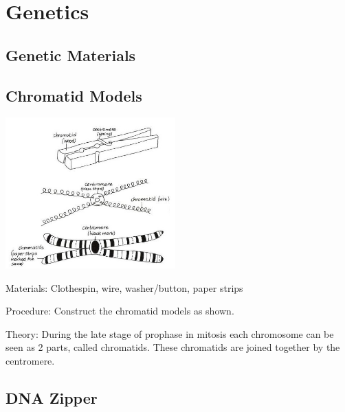\section{Genetics}

\begin{multicols}{2}


\section*{Genetic Materials}


\subsection{Chromatid Models} %

\begin{center}
\includegraphics[width=0.49\textwidth]{./img/vso/chromatid.jpg}
\end{center}

\begin{description*}
\item[Materials:]{Clothespin, wire, washer/button, paper strips}
\item[Procedure:]{Construct the chromatid models as shown.}
\item[Theory:]{During the late stage of prophase in mitosis each chromosome can be
seen as 2 parts, called chromatids. These chromatids are joined
together by the centromere.}
\end{description*}

\subsection{DNA Zipper} %


\end{multicols}
